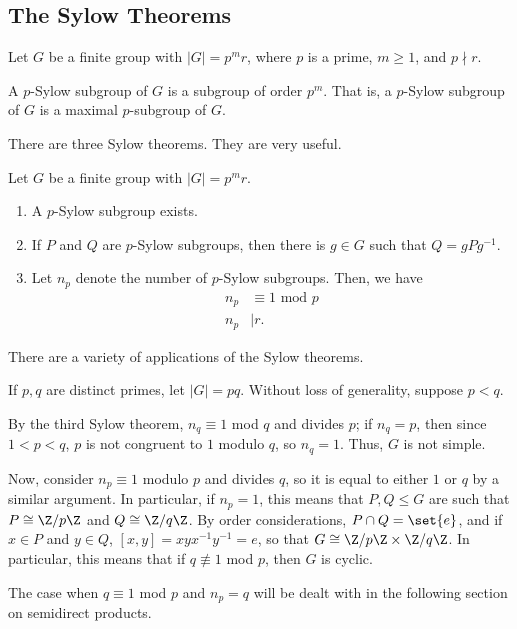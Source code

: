 \documentclass[10pt]{mypackage}
\begin{document}
\subsection{The Sylow Theorems}%
Let $G$ be a finite group with $\left\vert G \right\vert = p^{m}r$, where $p$ is a prime, $m\geq 1$, and $p\nmid r$.
\begin{definition}
  A $p$-Sylow subgroup of $G$ is a subgroup of order $p^{m}$. That is, a $p$-Sylow subgroup of $G$ is a maximal $p$-subgroup of $G$.
\end{definition}
There are three Sylow theorems. They are very useful.
\begin{theorem}
  Let $G$ be a finite group with $\left\vert G \right\vert = p^{m}r$.
  \begin{enumerate}[(1)]
    \item A $p$-Sylow subgroup exists.
    \item If $P$ and $Q$ are $p$-Sylow subgroups, then there is $g\in G$ such that $Q = gPg^{-1}$.
    \item Let $n_p$ denote the number of $p$-Sylow subgroups. Then, we have
      \begin{align*}
        n_p &\equiv 1\text{ mod }p\\
        n_p &\mid r.
      \end{align*}
  \end{enumerate}
\end{theorem}
There are a variety of applications of the Sylow theorems.
\begin{example}
  If $p,q$ are distinct primes, let $\left\vert G \right\vert = pq$. Without loss of generality, suppose $p < q$.

  By the third Sylow theorem, $n_q \equiv 1$ mod $q$ and divides $p$; if $n_q = p$, then since $1 < p < q$, $p$ is not congruent to $1$ modulo $q$, so $n_q = 1$. Thus, $G$ is not simple.

  Now, consider $n_p\equiv 1$ modulo $p$ and divides $q$, so it is equal to either $1$ or $q$ by a similar argument. In particular, if $n_p = 1$, this means that $P,Q\leq G$ are such that $P \cong \Z/p\Z$ and $Q \cong \Z/q\Z$. By order considerations, $P\cap Q = \set{e}$, and if $x\in P$ and $y\in Q$, $\left[ x,y \right] = xyx^{-1}y^{-1} = e$, so that $G \cong \Z/p\Z\times \Z/q\Z$. In particular, this means that if $q\not\equiv 1$ mod $p$, then $G$ is cyclic.

  The case when $q\equiv 1$ mod $p$ and $n_p = q$ will be dealt with in the following section on semidirect products.
\end{example}
\end{document}
